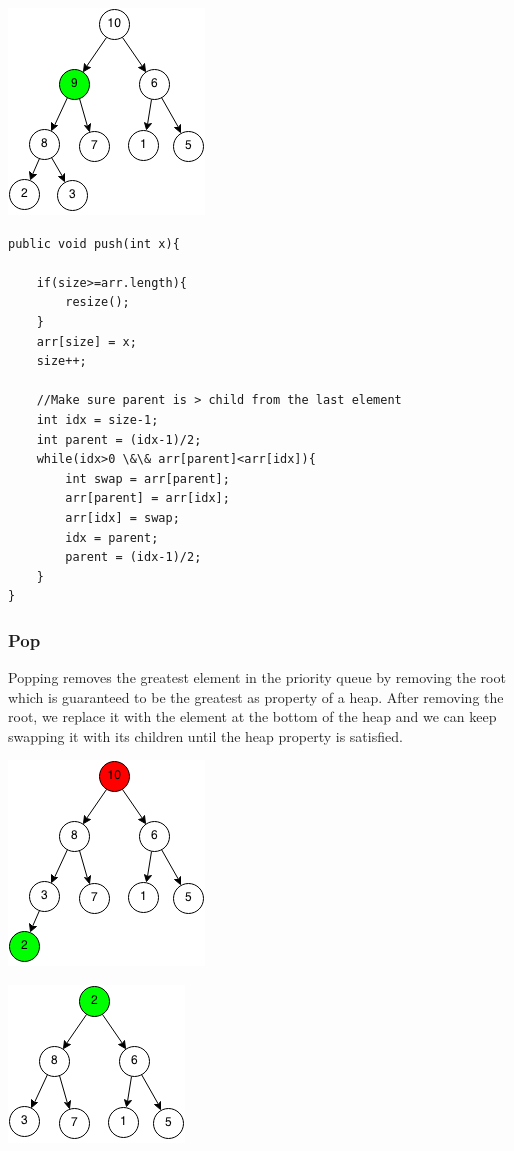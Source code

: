 \documentclass[11pt,oneside]{book}
\makeatletter
\def\maxwidth#1{\ifdim\Gin@nat@width>#1 #1\else\Gin@nat@width\fi}
\makeatother
\begin{document}
\includegraphics[width=\maxwidth{\textwidth}]{maxheappush3.png}

\begin{lstlisting}
public void push(int x){
        
    if(size>=arr.length){
        resize();
    }
    arr[size] = x;
    size++;
    
    //Make sure parent is > child from the last element
    int idx = size-1;
    int parent = (idx-1)/2;
    while(idx>0 \&\& arr[parent]<arr[idx]){
        int swap = arr[parent];
        arr[parent] = arr[idx];
        arr[idx] = swap;
        idx = parent;
        parent = (idx-1)/2;
    }
}
\end{lstlisting}

\subsubsection{Pop}

Popping removes the greatest element in the priority queue by removing the root which is guaranteed to be the greatest as property of a heap. After removing the root, we replace it with the element at the bottom of the heap and we can keep swapping it with its children until the heap property is satisfied.

\includegraphics[width=\maxwidth{\textwidth}]{maxheappop.png}

\includegraphics[width=\maxwidth{\textwidth}]{maxheappop1.png}
\end{document}
